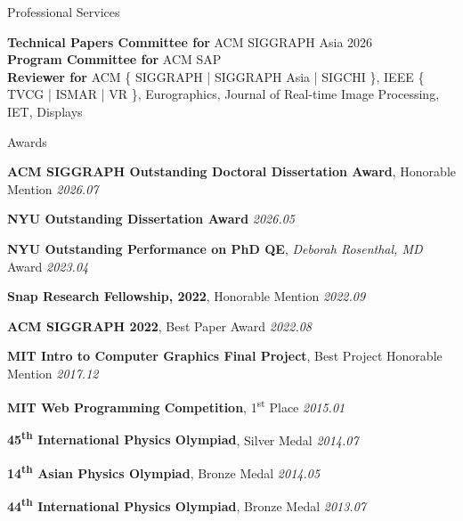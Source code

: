 \documentclass{resume}
\begin{document}
\newpage

\begin{area}{Professional Services}
    \item \textbf{Technical Papers Committee for} ACM SIGGRAPH Asia 2026\\
          \textbf{Program Committee for} ACM SAP\\
          \textbf{Reviewer for} ACM {\large\{} SIGGRAPH | SIGGRAPH Asia | SIGCHI {\large\}}, IEEE {\large\{} TVCG | ISMAR | VR {\large\}}, Eurographics, Journal of Real-time Image Processing, IET, Displays
\end{area}

\begin{area}{Awards}
    \item \textbf{ACM SIGGRAPH Outstanding Doctoral Dissertation Award}, Honorable Mention \hfill \emph{2026.07}
    \item \textbf{NYU Outstanding Dissertation Award} \hfill \emph{2026.05}
    \item \textbf{NYU Outstanding Performance on PhD QE}, \emph{Deborah Rosenthal, MD} Award \hfill \emph{2023.04}
    \item \textbf{Snap Research Fellowship, 2022}, Honorable Mention \hfill \emph{2022.09}
    \item \textbf{ACM SIGGRAPH 2022}, Best Paper Award \hfill \emph{2022.08}
    \item \textbf{MIT Intro to Computer Graphics Final Project}, Best Project Honorable Mention \hfill \emph{2017.12}
    \item \textbf{MIT Web Programming Competition}, 1\textsuperscript{st} Place \hfill \emph{2015.01}
    \item \textbf{45\textsuperscript{th} International Physics Olympiad}, Silver Medal \hfill \emph{2014.07}
    \item \textbf{14\textsuperscript{th} Asian Physics Olympiad}, Bronze Medal \hfill \emph{2014.05}
    \item \textbf{44\textsuperscript{th} International Physics Olympiad}, Bronze Medal \hfill \emph{2013.07}
\end{area}
\end{document}
